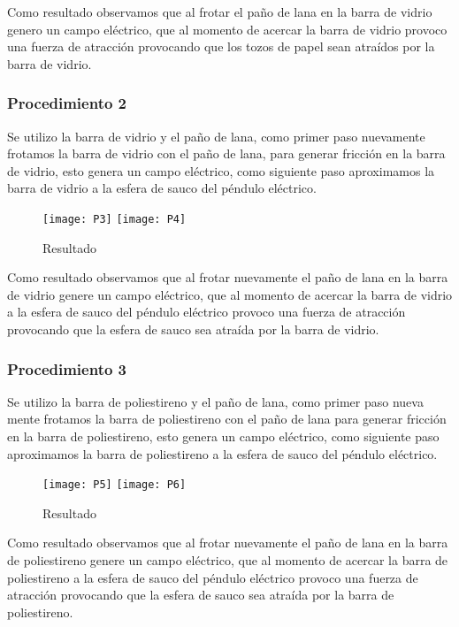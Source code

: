 \documentclass[spanish,10pt,a4paper,onecolumn]{article}
\begin{document}
Como resultado observamos que al frotar el paño de lana en la barra de vidrio genero un campo eléctrico, que al momento de acercar la barra de vidrio provoco una fuerza de atracción provocando que los tozos de papel sean atraídos por la barra de vidrio.

\subsubsection{Procedimiento 2}

Se utilizo la barra de vidrio y el paño de lana, como primer paso nuevamente frotamos la barra de vidrio con el paño de lana, para generar fricción en la barra de vidrio, esto genera un campo eléctrico, como siguiente paso aproximamos la barra de vidrio a la esfera de sauco del péndulo eléctrico.

\begin{figure}[h!]
	\centering
	\texttt{[image: P3]}
	\texttt{[image: P4]}
	\caption{Resultado}
\end{figure}

Como resultado observamos que al frotar nuevamente el paño de lana en la barra de vidrio genere un campo eléctrico, que al momento de acercar la barra de vidrio a la esfera de sauco del péndulo eléctrico provoco una fuerza de atracción provocando que la esfera de sauco sea atraída por la barra de vidrio.
\subsubsection{Procedimiento 3}
Se utilizo la barra de poliestireno y el paño de lana, como primer paso nueva mente frotamos la barra de poliestireno con el paño de lana para generar fricción en la barra de poliestireno, esto genera un campo eléctrico, como siguiente paso aproximamos la barra de poliestireno a la esfera de sauco del péndulo eléctrico.

\begin{figure}[h!]
	\centering
	\texttt{[image: P5]}
	\texttt{[image: P6]}
	\caption{Resultado}
\end{figure}

Como resultado observamos que al frotar nuevamente el paño de lana en la barra de poliestireno genere un campo eléctrico, que al momento de acercar la barra de poliestireno a la esfera de sauco del péndulo eléctrico provoco una fuerza de atracción provocando que la esfera de sauco sea atraída por la barra de poliestireno.
\end{document}
